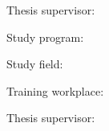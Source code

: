 


Thesis supervisor: \mySupervisor

\medskip{}
\myDateEN


\newpage
\thispagestyle{empty}
\mbox{}
\newpage





Study program: \myStudyProgramEN

Study field: \myDegreeCourseEN

Training workplace: \myInstituteEN

Thesis supervisor: \mySupervisor

\medskip{}

\myDateEN


\newpage
\thispagestyle{empty}
\mbox{}
\newpage

